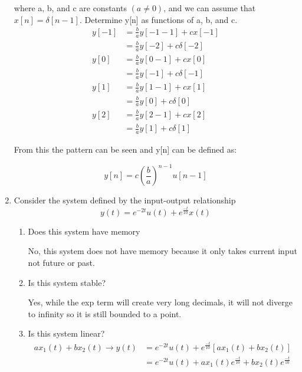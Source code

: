 \documentclass{article}
\begin{document}
\begin{enumerate}
    where a, b, and c are constants  $(a \ne 0)$, and we can assume that $x[n] = \delta [n-1]$. Determine y[n] as functions of a, b, and c.
    \begin{align}
        y[-1] &= \frac{b}{a}y[-1-1] + cx[-1]\\
        &= \frac{b}{a}y[-2] + c\delta[-2]\\
        y[0] &= \frac{b}{a}y[0-1] + cx[0]\\
        &= \frac{b}{a}y[-1] + c\delta[-1]\\
        y[1] &= \frac{b}{a}y[1-1] + cx[1]\\
        &= \frac{b}{a}y[0] + c\delta[0]\\
        y[2] &= \frac{b}{a}y[2-1] + cx[2]\\
        &= \frac{b}{a}y[1] +c\delta[1]
    \end{align}
    \begin{center}
        From this the pattern can be seen and y[n] can be defined as:
    \end{center}
    \begin{equation}
        y[n] = c\left(\frac{b}{a}\right)^{n-1} u[n-1]
    \end{equation}
    \newpage
    \item Consider the system defined by the input-output relationship
    \begin{equation}
        y(t) = e^{-2t}u(t) + e^{\frac{-t}{10}}x(t)
    \end{equation}
    \begin{enumerate}
        \item Does this system have memory
        \begin{center}
            No, this system does not have memory because it only takes current input not future or past.
        \end{center}
        \item Is this system stable?
        \begin{center}
            Yes, while the exp term will create very long decimals, it will not diverge to infinity so it is still bounded to a point.
        \end{center}
        \item Is this system linear?
        \begin{align}
            ax_1(t) + bx_2(t) \rightarrow y(t) &= e^{-2t}u(t) + e^{\frac{-t}{10}}[ax_1(t) + bx_2(t)]\\
            &= e^{-2t}u(t) + ax_1(t)e^{\frac{-t}{10}}+ bx_2(t)e^{\frac{-t}{10}}

\end{align}
\end{enumerate}
\end{enumerate}
\end{document}
